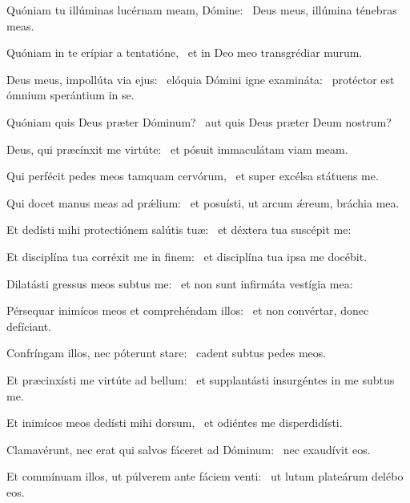 \item Quóniam tu illúminas lucérnam meam, Dómine:~\psstar{} Deus meus, illúmina ténebras meas.

\item Quóniam in te erípiar a tentatióne,~\psstar{} et in Deo meo transgrédiar murum.

\item Deus meus, impollúta via ejus:~\pscross{} elóquia Dómini igne examináta:~\psstar{} protéctor est ómnium sperántium in se.

\item Quóniam quis Deus præter Dóminum?~\psstar{} aut quis Deus præter Deum nostrum?

\item Deus, qui præcínxit me virtúte:~\psstar{} et pósuit immaculátam viam meam.

\item Qui perfécit pedes meos tamquam cervórum,~\psstar{} et super excélsa státuens me.

\item Qui docet manus meas ad prǽlium:~\psstar{} et posuísti, ut arcum ǽreum, bráchia mea.

\item Et dedísti mihi protectiónem salútis tuæ:~\psstar{} et déxtera tua suscépit me:

\item Et disciplína tua corréxit me in finem:~\psstar{} et disciplína tua ipsa me docébit.

\item Dilatásti gressus meos subtus me:~\psstar{} et non sunt infirmáta vestígia mea:

\item Pérsequar inimícos meos et comprehéndam illos:~\psstar{} et non convértar, donec defíciant.

\item Confríngam illos, nec póterunt stare:~\psstar{} cadent subtus pedes meos.

\item Et præcinxísti me virtúte ad bellum:~\psstar{} et supplantásti insurgéntes in me subtus me.

\item Et inimícos meos dedísti mihi dorsum,~\psstar{} et odiéntes me disperdidísti.

\item Clamavérunt, nec erat qui salvos fáceret ad Dóminum:~\psstar{} nec exaudívit eos.

\item Et commínuam illos, ut púlverem ante fáciem venti:~\psstar{} ut lutum plateárum delébo eos.

